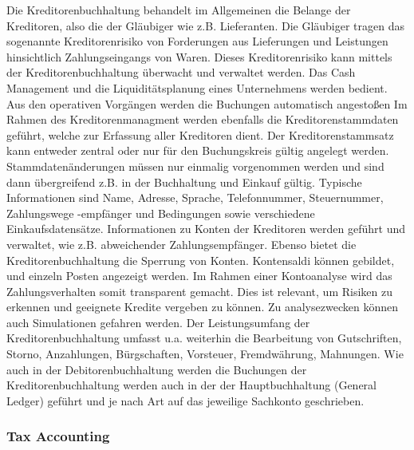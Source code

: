 Die Kreditorenbuchhaltung behandelt im Allgemeinen die Belange der Kreditoren, also die der Gläubiger wie z.B. Lieferanten. Die Gläubiger tragen das sogenannte Kreditorenrisiko von Forderungen aus Lieferungen und Leistungen hinsichtlich Zahlungseingangs von Waren. Dieses Kreditorenrisiko kann mittels der Kreditorenbuchhaltung überwacht und verwaltet werden. Das Cash Management und die Liquiditätsplanung eines Unternehmens werden bedient. \glqq Aus den operativen Vorgängen werden die Buchungen automatisch angestoßen\grqq
Im Rahmen des Kreditorenmanagment werden ebenfalls die Kreditorenstammdaten geführt, welche zur Erfassung aller Kreditoren dient. Der Kreditorenstammsatz kann entweder zentral oder nur für den Buchungskreis gültig angelegt werden. Stammdatenänderungen müssen nur einmalig vorgenommen werden und sind dann übergreifend z.B. in der Buchhaltung und Einkauf gültig. Typische Informationen sind Name, Adresse, Sprache, Telefonnummer, Steuernummer, Zahlungswege -empfänger und Bedingungen sowie verschiedene Einkaufsdatensätze. 
Informationen zu Konten der Kreditoren werden geführt und verwaltet, wie z.B. abweichender Zahlungsempfänger. Ebenso bietet die Kreditorenbuchhaltung die Sperrung von Konten. Kontensaldi können gebildet, und einzeln Posten angezeigt werden. Im Rahmen einer Kontoanalyse wird das Zahlungsverhalten somit transparent gemacht. Dies ist relevant, um Risiken zu erkennen und geeignete Kredite vergeben zu können. Zu analysezwecken können auch Simulationen gefahren werden. Der Leistungsumfang der Kreditorenbuchhaltung umfasst u.a. weiterhin die Bearbeitung von Gutschriften, Storno, Anzahlungen, Bürgschaften, Vorsteuer, Fremdwährung, Mahnungen.
Wie auch in der Debitorenbuchhaltung werden die Buchungen der Kreditorenbuchhaltung werden auch in der der Hauptbuchhaltung (General Ledger) geführt und je nach Art auf das jeweilige Sachkonto geschrieben.



\subsubsection{Tax Accounting} %

